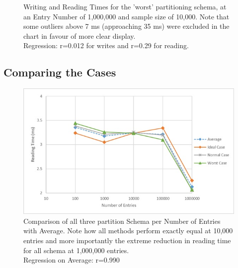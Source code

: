 \documentclass{template/csfourzero}
\begin{document}
  \begin{figure}[H]
      \centering
      \noindent{}
      \caption{Writing and Reading Times for the 'worst' partitioning schema, at an Entry Number of 1,000,000 and sample size of 10,000. Note that some outliers above 7 ms (approaching 35 ms) were excluded in the chart in favour of more clear display.
      \\
      Regression: r=0.012 for writes and r=0.29 for reading.}
      \label{fig:worstFull}
  \end{figure}
  
  \subsection{Comparing the Cases}
  
  \begin{figure}
      \centering
      \includegraphics{figures/allTimes.jpg}
      \caption{Comparison of all three partition Schema per Number of Entries with Average. Note how all methods perform exactly equal at 10,000 entries and more importantly the extreme reduction in reading time for all schema at 1,000,000 entries. \\  Regression on Average: r=0.990}
      \label{fig:allTimes}
  \end{figure}
  
\end{document}

